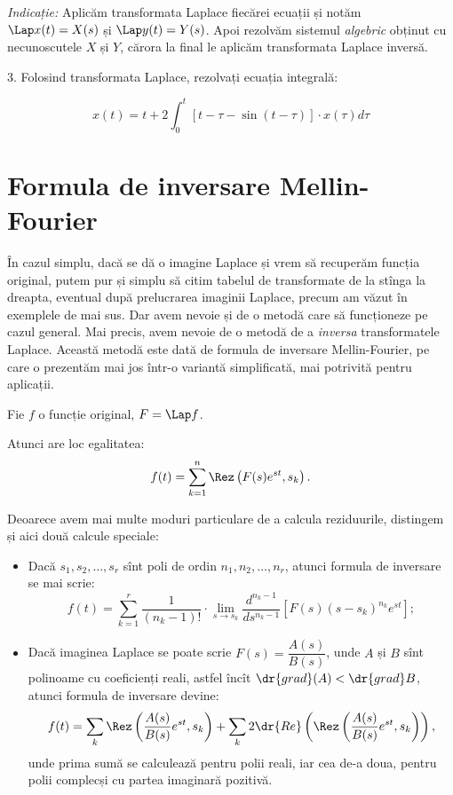 \emph{Indicație:} Aplicăm transformata Laplace fiecărei ecuații
și notăm $ \Lap x(t) = X(s) $ și $ \Lap y(t) = Y(s) $. Apoi rezolvăm sistemul
\emph{algebric} obținut cu necunoscutele $ X $ și $ Y $, cărora la final le
aplicăm transformata Laplace inversă.

\vspace{0.3cm}

3. Folosind transformata Laplace, rezolvați ecuația integrală:

\[
    x(t) = t + 2 \int_0^t \left[ t - \tau - \sin(t - \tau) \right] \cdot x(\tau) d \tau
\]


\section{Formula de inversare Mellin-Fourier}

În cazul simplu, dacă se dă o imagine Laplace și vrem să recuperăm funcția
original, putem pur și simplu să citim tabelul de transformate de la stînga
la dreapta, eventual după prelucrarea imaginii Laplace, precum am văzut în
exemplele de mai sus. Dar avem nevoie și de o metodă care să funcționeze 
pe cazul general. Mai precis, avem nevoie de o metodă de a \emph{inversa}
transformatele Laplace. Această metodă este dată de formula de inversare
Mellin-Fourier, pe care o prezentăm mai jos într-o variantă simplificată,
mai potrivită pentru aplicații.

\begin{theorem}\label{thm:mellin-fourier}
    Fie $ f $ o funcție original, $ F = \Lap f $.

    Atunci are loc egalitatea:
    \[
        f(t) = \sum_{k=1}^n \Rez\left(F(s)e^{st}, s_k\right).
    \]
\end{theorem}

Deoarece avem mai multe moduri particulare de a calcula reziduurile, distingem
și aici două calcule speciale:
\begin{itemize}
    \item Dacă $ s_1, s_2, \dots, s_r $ sînt poli de ordin $ n_1, n_2, \dots, n_r $, atunci
        formula de inversare se mai scrie:
        \[
            f(t) = \sum_{k=1}^r \dfrac{1}{(n_k - 1)!} \cdot %
            \lim_{s \to s_k} \dfrac{d^{n_k - 1}}{ds^{n_k - 1}} \left[ %
            F(s)(s - s_k)^{n_k} e^{st} \right];
        \]
    \item Dacă imaginea Laplace se poate scrie $ F(s) = \dfrac{A(s)}{B(s)} $,
        unde $ A $ și $ B $ sînt polinoame cu coeficienți reali, astfel încît
        $ \dr{grad}(A) < \dr{grad}B $, atunci formula de inversare devine:
        \[
            f(t) = \sum_k \Rez\left(\dfrac{A(s)}{B(s)}e^{st}, s_k\right) + %
            \sum_k 2 \dr{Re} \left( \Rez \left( \dfrac{A(s)}{B(s)}e^{st}, s_k \right) \right),
        \]
        unde prima sumă se calculează pentru polii reali, iar cea de-a doua, pentru
        polii complecși cu partea imaginară pozitivă.
\end{itemize}

